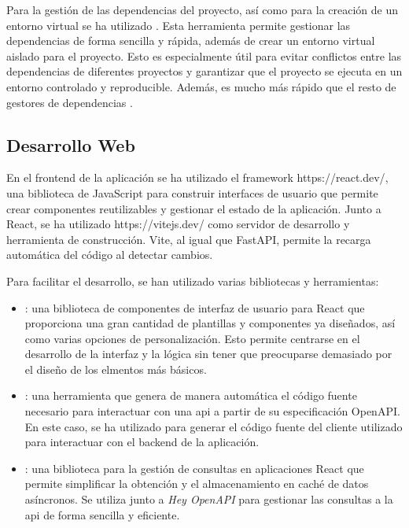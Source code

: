 Para la gestión de las dependencias del proyecto, así como para la creación de
un entorno virtual se ha utilizado . Esta
herramienta permite gestionar las dependencias de forma sencilla y rápida,
además de crear un entorno virtual aislado para el proyecto. Esto es
especialmente útil para evitar conflictos entre las dependencias de diferentes
proyectos y garantizar que el proyecto se ejecuta en un entorno controlado y
reproducible. Además, es mucho más rápido que el resto de gestores de
dependencias \parencite{Katabattuni2024Nov}.

\subsection{Desarrollo Web}
\label{sec:desarrollo-web}
En el \gls{frontend} de la aplicación se ha utilizado el \gls{framework}
 {https://react.dev/}, una biblioteca de JavaScript para construir
interfaces de usuario que permite crear componentes reutilizables y gestionar el
estado de la aplicación. Junto a React, se ha utilizado 
{https://vitejs.dev/} como servidor de desarrollo y herramienta de construcción.
Vite, al igual que FastAPI, permite la recarga automática del código al detectar
cambios.

Para facilitar el desarrollo, se han utilizado varias bibliotecas y herramientas:
\begin{itemize}
    \item {}: una biblioteca de componentes de
    interfaz de usuario para React que proporciona una gran cantidad de
    plantillas y componentes ya diseñados, así como varias opciones de
    personalización. Esto permite centrarse en el desarrollo de la interfaz y la
    lógica sin tener que preocuparse demasiado por el diseño de los elmentos más
    básicos.

    \item {}: una herramienta que
    genera de manera automática el código fuente necesario para interactuar con
    una \gls{api} a partir de su especificación OpenAPI. En este caso, se ha
    utilizado para generar el código fuente del cliente utilizado para
    interactuar con el \gls{backend} de la aplicación.

    \item {}: una
    biblioteca para la gestión de consultas en aplicaciones React que permite
    simplificar la obtención y el almacenamiento en caché de datos asíncronos.
    Se utiliza junto a \textit{Hey OpenAPI} para gestionar las consultas a la
    \gls{api} de forma sencilla y eficiente.
\end{itemize}

